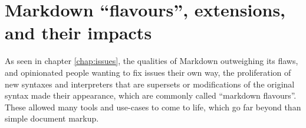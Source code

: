 \chapter{Markdown ``flavours'', extensions, and their impacts}
\label{chap:proliferation}

\vspace{1cm}

As seen in chapter \ref{chap:issues}, the qualities of Markdown outweighing its flaws, and opinionated people wanting to fix issues
their own way, the proliferation of new syntaxes and interpreters that are supersets or modifications of the original syntax made their appearance,
which are commonly called ``markdown flavours''. These allowed many tools and use-cases to come to life, which go far beyond than simple document
markup.

\cite{voegler2014markdown}